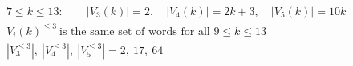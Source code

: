 \documentclass{article}
\begin{document}
\[
\begin{aligned}
&7\le k\le13:\qquad |V_3(k)|=2,\quad |V_4(k)|=2k+3,\quad |V_5(k)|=10k\\
&V_i(k)^{\le3}\ \text{is the same set of words for all }9\le k\le13\\
&|V_3^{\le3}|,\ |V_4^{\le3}|,\ |V_5^{\le3}|=2,\ 17,\ 64
\end{aligned}
\]
\end{document}
